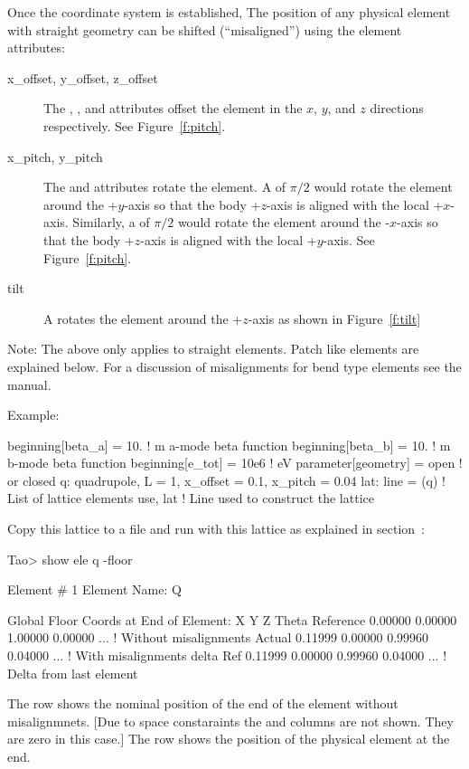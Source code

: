 \documentclass{hitec}
\begin{document}
Once the  coordinate system is established, The position of any physical element with straight geometry can
be shifted (``misaligned'') using the element attributes:
\begin{description}
\item[x_offset, y_offset, z_offset]
The , , and  attributes offset the element in the $x$, $y$,
and $z$ directions respectively. See Figure~\ref{f:pitch}.
\item[x_pitch, y_pitch]
The  and  attributes rotate the element. A  of $\pi/2$ would rotate the
element around the +$y$-axis so that the body +$z$-axis is aligned with the local
+$x$-axis. Similarly, a  of $\pi/2$ would rotate the element around the -$x$-axis so
that the body +$z$-axis is aligned with the local +$y$-axis. See Figure~\ref{f:pitch}.
\item[tilt]
A  rotates the element around the +$z$-axis as shown in Figure~\ref{f:tilt}
\end{description}

Note: The above only applies to straight elements. Patch like elements are explained below. For a
discussion of misalignments for bend type elements see the \bmad manual.

Example:
\begin{code}
beginning[beta_a] = 10.   ! m  a-mode beta function
beginning[beta_b] = 10.   ! m  b-mode beta function
beginning[e_tot] = 10e6   ! eV
parameter[geometry] = open  ! or closed
q: quadrupole, L = 1, x_offset = 0.1, x_pitch = 0.04
lat: line = (q)   ! List of lattice elements
use, lat          ! Line used to construct the lattice
\end{code}

Copy this lattice to a file and run \tao with this lattice as explained in
section~:

\begin{code} 
Tao> show ele q -floor

 Element #                1
 Element Name: Q

Global Floor Coords at End of Element:
                X        Y        Z    Theta  
Reference  0.00000  0.00000  1.00000  0.00000 ... ! Without misalignments
Actual     0.11999  0.00000  0.99960  0.04000 ... ! With misalignments
delta Ref  0.11999  0.00000  0.99960  0.04000 ... ! Delta from last element
\end{code}

The  row shows the nominal position of the  end of the element without
misalignmnets. [Due to space constaraints the  and  columns are not shown. They are
zero in this case.] The  row shows the position of the physical element at the  end.
\end{document}
